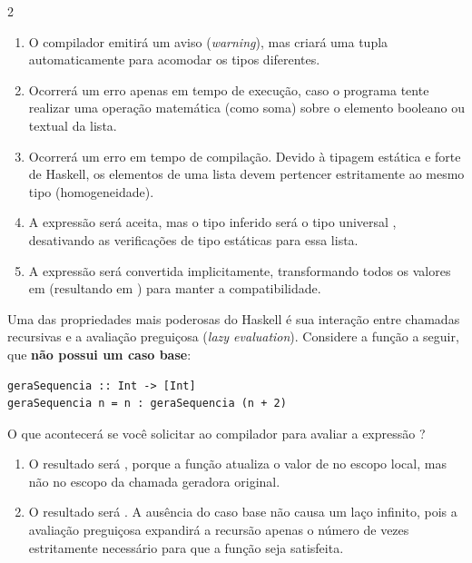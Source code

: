 \documentclass[a4paper,10pt,brazil]{article}
\begin{document}
\begin{multicols}{2}
\begin{enumerate}
  \item O compilador emitirá um aviso (\emph{warning}), mas criará uma tupla automaticamente para acomodar os tipos diferentes.

  \item Ocorrerá um erro apenas em tempo de execução, caso o programa tente realizar uma operação matemática (como soma) sobre o elemento booleano ou textual da lista.

  \item Ocorrerá um erro em tempo de compilação. Devido à tipagem estática e forte de Haskell, os elementos de uma lista devem pertencer estritamente ao mesmo tipo (homogeneidade).

  \item A expressão será aceita, mas o tipo inferido será o tipo universal , desativando as verificações de tipo estáticas para essa lista.

  \item A expressão será convertida implicitamente, transformando todos os valores em  (resultando em ) para manter a compatibilidade.


\end{enumerate}

Uma das propriedades mais poderosas do Haskell é sua interação entre chamadas recursivas e a avaliação preguiçosa (\emph{lazy evaluation}). Considere a função a seguir, que \textbf{não possui um caso base}:

\begin{verbatim}
geraSequencia :: Int -> [Int]
geraSequencia n = n : geraSequencia (n + 2)
\end{verbatim}

O que acontecerá se você solicitar ao compilador para avaliar a expressão ?

\begin{enumerate}
  \item O resultado será \haskellinline{[10, 10, 10]}, porque a função atualiza o valor de  no escopo local, mas não no escopo da chamada geradora original.

  \item O resultado será \haskellinline{[10, 12, 14]}. A ausência do caso base não causa um laço infinito, pois a avaliação preguiçosa expandirá a recursão apenas o número de vezes estritamente necessário para que a função  seja satisfeita.


\end{enumerate}
\end{multicols}
\end{document}
